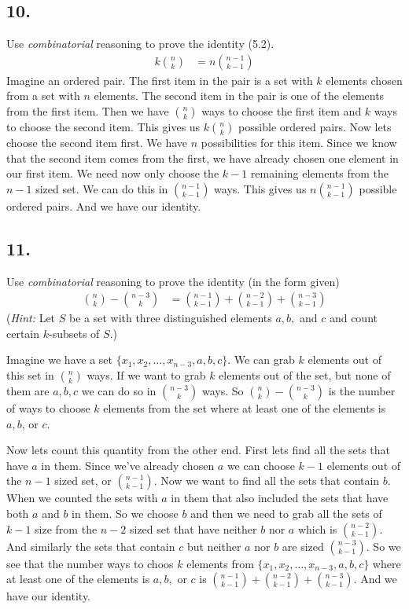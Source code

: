\documentclass{article}
\begin{document}
\subsection*{10.}
Use \emph{combinatorial} reasoning to prove the identity (5.2).
\begin{align*}
  k\binom{n}{k}&=n\binom{n-1}{k-1}
\end{align*}
Imagine an ordered pair. The first item in the pair is a set with $k$ elements chosen from a set with $n$ elements. The second item in the pair is one of the elements from the first item. Then we have $\binom{n}{k}$ ways to choose the first item and $k$ ways to choose the second item. This gives us $k\binom{n}{k}$ possible ordered pairs. Now lets choose the second item first. We have $n$ possibilities for this item. Since we know that the second item comes from the first, we have already chosen one element in our first item. We need now only choose the $k-1$ remaining elements from the $n-1$ sized set. We can do this in $\binom{n-1}{k-1}$ ways. This gives us $n\binom{n-1}{k-1}$ possible ordered pairs. And we have our identity.
\subsection*{11.}
Use \emph{combinatorial} reasoning to prove the identity (in the form given)
\begin{align*}
  \binom{n}{k}-\binom{n-3}{k}&=\binom{n-1}{k-1}+\binom{n-2}{k-1}+\binom{n-3}{k-1}
\end{align*}
(\emph{Hint:} Let $S$ be a set with three distinguished elements $a, b,$ and $c$ and count certain $k$-subsets of $S$.)

Imagine we have a set $\{x_1,x_2,\dots,x_{n-3},a,b,c\}$. We can grab $k$ elements out of this set in $\binom{n}{k}$ ways. If we want to grab $k$ elements out of the set, but none of them are $a,b,c$ we can do so in $\binom{n-3}{k}$ ways. So $\binom{n}{k}-\binom{n-3}{k}$ is the number of ways to choose $k$ elements from the set where at least one of the elements is $a,b$, or $c$.

Now lets count this quantity from the other end. First lets find all the sets that have $a$ in them. Since we've already chosen $a$ we can choose $k-1$ elements out of the $n-1$ sized set, or $\binom{n-1}{k-1}$. Now we want to find all the sets that contain $b$. When we counted the sets with $a$ in them that also included the sets that have both $a$ and $b$ in them. So we choose $b$ and then we need to grab all the sets of $k-1$ size from the $n-2$ sized set that have neither $b$ nor $a$ which is $\binom{n-2}{k-1}$. And similarly the sets that contain $c$ but neither $a$ nor $b$ are sized $\binom{n-3}{k-1}$. So we see that the number ways to choos $k$ elements from $\{x_1,x_2,\dots,x_{n-3},a,b,c\}$ where at least one of the elements is $a,b,$ or $c$ is $\binom{n-1}{k-1}+\binom{n-2}{k-1}+\binom{n-3}{k-1}$. And we have our identity.
\end{document}
